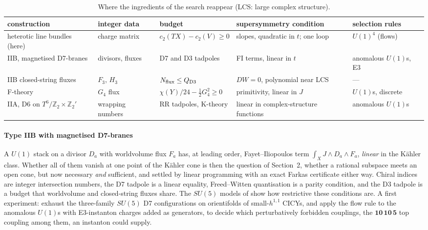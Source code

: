 \documentclass[10pt,a4paper]{article}
\newcommand{\Z}{\mathbb{Z}}
\begin{document}
\begin{table}[h]
\centering\footnotesize
\setlength{\tabcolsep}{4pt}
\renewcommand{\arraystretch}{1.1}
\begin{tabularx}{\textwidth}{@{}>{\raggedright}p{3.2cm}>{\raggedright}p{2.3cm}>{\raggedright}p{3.0cm}>{\raggedright}X>{\raggedright\arraybackslash}p{2.9cm}@{}}
\toprule
construction & integer data & budget & supersymmetry condition & selection rules \\
\midrule
heterotic line bundles (here) & charge matrix & $c_2(TX)-c_2(V)\ge0$ & slopes, quadratic in $t$; one loop \cite{BHW05} & $U(1)^4$ (flows) \\
IIB, magnetised D7-branes & divisors, fluxes & D7 and D3 tadpoles & FI terms, linear in $t$ & anomalous $U(1)$s, E3 \\
IIB closed-string fluxes & $F_3$, $H_3$ & $N_{\rm flux}\le Q_{\rm D3}$ & $DW=0$, polynomial near LCS & --- \\
F-theory & $G_4$ flux & $\chi(Y)/24-\tfrac12G_4^2\ge0$ & primitivity, linear in $J$ & $U(1)$s, discrete \\
IIA, D6 on $T^6/\Z_2\times\Z_2'$ & wrapping numbers & RR tadpoles, K-theory & linear in complex-structure functions & anomalous $U(1)$s \\
\bottomrule
\end{tabularx}
\caption{Where the ingredients of the search reappear (LCS: large complex structure).}
\label{tab:outlook}
\end{table}

\vspace{-4pt}
\paragraph{Type IIB with magnetised D7-branes} A $U(1)$ stack on a divisor
$D_a$ with worldvolume flux $F_a$ has, at leading order, Fayet--Iliopoulos term
$\int_XJ\wedge D_a\wedge F_a$, \emph{linear} in the Kähler class. Whether all
of them vanish at one point of the Kähler cone is then the question of
Section~2, whether a rational subspace meets an open cone, but now necessary
\emph{and} sufficient, and settled by linear programming with an exact Farkas
certificate either way. Chiral indices are integer intersection numbers, the D7
tadpole is a linear equality, Freed--Witten quantisation is a parity condition,
and the D3 tadpole is a budget that worldvolume and closed-string fluxes share.
The $SU(5)$ models of \cite{BBGW08} show how restrictive these conditions are.
A first experiment: exhaust the three-family $SU(5)$ D7 configurations on
orientifolds of small-$h^{1,1}$ CICYs, and apply the flow rule to the anomalous
$U(1)$s with E3-instanton charges added as generators, to decide which
perturbatively forbidden couplings, the $\mathbf{10}\,\mathbf{10}\,\mathbf5$
top coupling among them, an instanton could supply.
\end{document}
